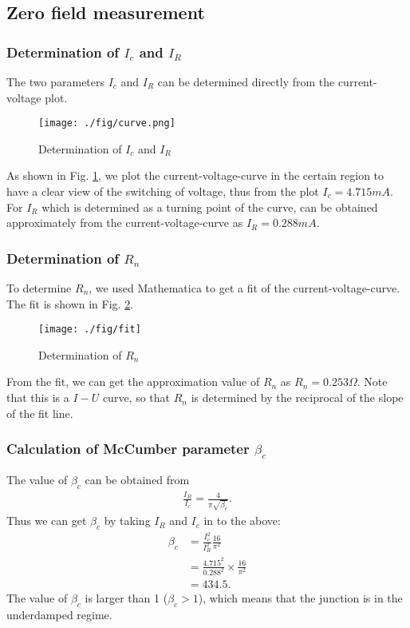 \subsection{Zero field measurement}

\subsubsection{Determination of $I_{c}$ and $I_{R}$}
The two parameters $I_{c}$ and $I_{R}$ can be determined directly from the current-voltage plot.


\begin{figure}[h]
\centering
\texttt{[image: ./fig/curve.png]}
\caption{Determination of $I_{c}$ and $I_{R}$}
\label{UIcurvePicture}
\end{figure}


As shown in Fig. \ref{UIcurvePicture}, we plot the current-voltage-curve in the certain region to have a clear view of the switching of voltage,
thus from the plot $I_{c}=4.715mA$. For $I_{R}$ which is determined as a turning point of the curve, can be obtained approximately from the current-voltage-curve as $I_R=0.288mA$.
\subsubsection{Determination of $R_{n}$}
To determine $R_{n}$, we used Mathematica to get a fit of the current-voltage-curve. The fit is shown in Fig. \ref{determinationRNfigure}.

\begin{figure}[h]
\centering
\texttt{[image: ./fig/fit]}
\caption{Determination of $R_{n}$}
\label{determinationRNfigure}
\end{figure}


From the fit, we can get the approximation value of $R_{n}$ as $R_{n}=0.253\Omega$. Note that this is a $I-U$ curve, so that $R_{n}$ is determined by the reciprocal of the slope of the fit line.

\subsubsection{Calculation of McCumber parameter $\beta_{c}$}
The value of $\beta_{c}$ can be obtained from
\begin{align*}
\frac{I_{R}}{I_{c}}=\frac{4}{\pi\sqrt{\beta_{c}}}.
\end{align*}
Thus we can get $\beta_{c}$ by taking $I_{R}$ and $I_{c}$ in to the above:
\begin{align*}
\beta_c & =\frac{I_{c}^2}{I_{R}^2}\frac{16}{\pi^2}\\
    & =\frac{4.715^2}{0.288^2}\times\frac{16}{\pi^2}\\
    & =434.5.
\end{align*}
The value of $\beta_c$ is larger than 1 ($\beta_{c}>1$), which means that the junction is in the underdamped regime.


